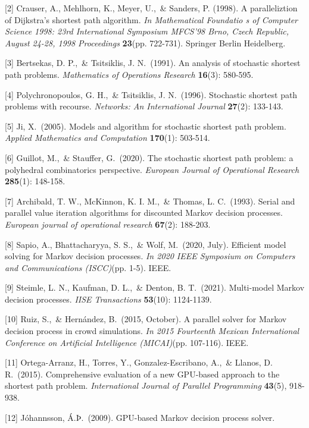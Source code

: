 \documentclass{article}
\begin{document}
[2] Crauser, A., Mehlhorn, K., Meyer, U.,\ \& Sanders, P. (1998). A paralleliztion 
  of Dijkstra's shortest path algorithm. {\it In Mathematical Foundatio
  s of Computer Science 1998: 23rd International Symposium MFCS'98 Brno, 
  Czech Republic, August 24-28, 1998 Proceedings} {\bf 23}(pp. 722-731). Springer Berlin Heidelberg.

[3] Bertsekas, D. P.,\ \& Tsitsiklis, J. N.\ (1991). An analysis of stochastic shortest path problems. 
  {\it Mathematics of Operations Research} {\bf 16}(3): 580-595.

[4] Polychronopoulos, G. H.,\ \& Tsitsiklis, J. N.\ (1996). Stochastic shortest path problems with 
  recourse. {\it Networks: An International Journal} {\bf 27}(2): 133-143.

[5] Ji, X.\ (2005). Models and algorithm for stochastic shortest path problem. {\it Applied Mathematics 
  and Computation} {\bf 170}(1): 503-514.

[6] Guillot, M.,\ \& Stauffer, G.\ (2020). The stochastic shortest path problem: a polyhedral combinatorics 
  perspective. {\it European Journal of Operational Research} {\bf 285}(1): 148-158.

[7] Archibald, T. W., McKinnon, K. I. M.,\ \& Thomas, L. C.\ (1993). Serial and parallel value iteration 
  algorithms for discounted Markov decision processes. {\it European journal of operational research} {\bf 67}(2): 188-203.

[8] Sapio, A., Bhattacharyya, S. S.,\ \& Wolf, M.\ (2020, July). Efficient model solving for Markov decision processes. 
  {\it In 2020 IEEE Symposium on Computers and Communications (ISCC)}(pp. 1-5). IEEE.

[9] Steimle, L. N., Kaufman, D. L.,\ \& Denton, B. T.\ (2021). Multi-model Markov decision processes. 
  {\it IISE Transactions} {\bf 53}(10): 1124-1139.

[10] Ruiz, S.,\ \& Hernández, B.\ (2015, October). A parallel solver for Markov decision process in crowd simulations. 
  {\it In 2015 Fourteenth Mexican International Conference on Artificial Intelligence (MICAI)}(pp. 107-116). IEEE.

[11] Ortega-Arranz, H., Torres, Y., Gonzalez-Escribano, A.,\ \& Llanos, D. R.\ (2015). Comprehensive evaluation of 
  a new GPU-based approach to the shortest path problem. {\it International Journal of Parallel Programming} {\bf 43}(5), 918-938.

[12] Jóhannsson, Á.Þ.\ (2009). GPU-based Markov decision process solver.
\end{document}
